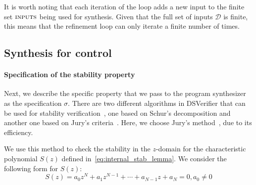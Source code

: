 \documentclass{sig-alternate-05-2015}
\newcommand{\blue}[1]{{\color{blue}#1}}
\newcommand{\red}[1]{{\color{red}#1}}
\begin{document}

It is
worth noting that each iteration of the loop adds a new input to the
finite set $\text{\sc inputs}$ being used for synthesis.  Given that
the full set of inputs $\mathcal{D}$
is finite, this means that the refinement loop
can only iterate a finite number of times.

\subsection{Synthesis for control}
\label{synthesis-elements}

\paragraph{Specification of the stability property}

Next, we describe the specific property that we pass to the program
synthesizer as the specification $\sigma$.  There are two different
algorithms in DSVerifier that can be used for stability
verification~\cite{daes20161,Bessa16}, one based on
Schur's decomposition and another one based on Jury's
criteria~\cite{astrom1997computer}.  Here, we choose Jury's
method~\cite{astrom1997computer}, due to its efficiency.

We use this method to check the stability in the $z$-domain for the
characteristic polynomial $S(z)$ defined
in~\eqref{eq:internal_stab_lemma}.
%
%
We consider the following form for $S(z)$:
%
$$
S(z) = a_0z^N+a_1z^{N-1}+\cdots+a_{N-1}z+a_N=0, a_0\neq0
$$
%

\end{document}
